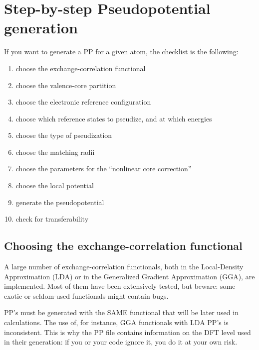\section{Step-by-step Pseudopotential generation} 

If you want to generate a PP for a given atom, the checklist is the
following:

\begin{enumerate}
\item choose the exchange-correlation functional
\item choose the valence-core partition
\item choose the electronic reference configuration
\item choose which reference states to pseudize, and at which energies
\item choose the type of pseudization
\item choose the matching radii
\item choose the parameters for the ``nonlinear core 
      correction''\cite{CoreCorr}
\item choose the local potential
\item generate the pseudopotential
\item check for transferability
\end{enumerate}

\subsection{Choosing the exchange-correlation functional}

A large number of exchange-correlation functionals, both 
in the Local-Density Approximation (LDA) or in the Generalized
Gradient Approximation (GGA), are implemented.
Most of them have been extensively tested, but beware: 
some exotic or seldom-used functionals might contain bugs.

PP's must be generated with the SAME functional that will
be later used in calculations. The use of, for instance,
GGA functionals with LDA PP's is inconsistent. This is why
the PP file contains information on the DFT level used in their
generation: if you or your code ignore it, you do it at your
own risk.

